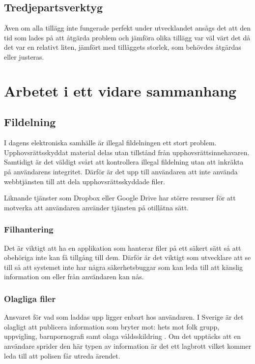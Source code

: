 \subsection{Tredjepartsverktyg}

Även om alla tillägg inte fungerade perfekt under utvecklandet ansågs det att den tid som lades på att åtgärda problem och jämföra olika tillägg var väl värt det då det var en relativt liten, jämfört med tilläggets storlek, som behövdes åtgärdas eller justeras.


\section{Arbetet i ett vidare sammanhang}

\subsection{Fildelning}

I dagens elektroniska samhälle är illegal fildelningen ett stort problem. Upphovsrättsskyddat material delas utan tillstånd från upphovsrättsinnehavaren. Samtidigt är det väldigt svårt att kontrollera illegal fildelning utan att inkräkta på användarens integritet. Därför är det upp till användaren att inte använda webbtjänsten till att dela upphovsrättsskyddade filer.

Liknande tjänster som Dropbox eller Google Drive har större resurser för att motverka att användaren använder tjänsten på otillåtna sätt.

\subsubsection{Filhantering}

Det är viktigt att ha en applikation som hanterar filer på ett säkert sätt så att obehöriga inte kan få tillgång till dem. Därför är det viktigt som utvecklare att se till så att systemet inte har några säkerhetsbuggar som kan leda till att känslig information om eller från användaren kan nås.

\subsubsection{Olagliga filer}

Ansvaret för vad som laddas upp ligger enbart hos användaren. I Sverige är det olagligt att publicera information som bryter mot: hets mot folk grupp, uppvigling, barnpornografi samt olaga våldsskildring \cite{polisen}. Om det upptäcks att en användare sprider den här typen av information är det ett lagbrott vilket kommer leda till att polisen får utreda ärendet.

